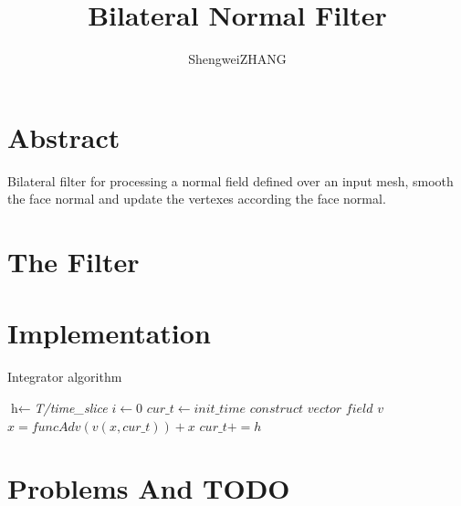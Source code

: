 \documentclass{article}
\title{Bilateral Normal Filter}
\author{ShengweiZHANG\\
}
\theoremstyle{definition}
\theoremstyle{remark}
\begin{document}
\maketitle

\section{Abstract}
Bilateral filter for processing a normal field defined over an input mesh, smooth the face normal and update the vertexes according the face normal.
\section{The Filter}

\section{Implementation}
\begin{algorithm}
\caption{Integrator algorithm}\label{euclid}
\begin{algorithmic}
\State $\textit{h} \gets $\textit{T/time\_slice}
\State $i \gets \textit{0}$
\State $cur\_t \gets \textit{init\_time}$
\EndProcedure
 \State $\textit{construct vector field v}$
 \State$x = funcAdv(v(x,cur\_t)) + x$
 \State$cur\_t += h$
\EndFor
\end{algorithmic}
\end{algorithm}

\section{Problems And TODO}







\end{document}
